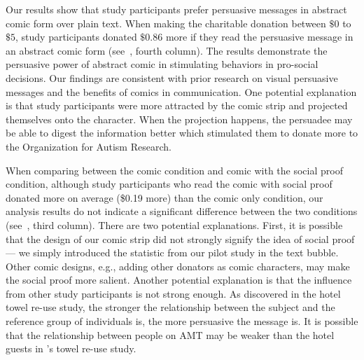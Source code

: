 \begin{description} [leftmargin=\parindent,topsep=0pt,partopsep=3pt,parsep=0pt,itemsep=3pt, listparindent=\parindent]
    \item[Comic vs. Plain Text:] Our results show that study participants prefer persuasive messages in abstract comic form over plain text. When making the charitable donation between $\$0$ to $\$5$, study participants donated $\$ 0.86$ more if they read the persuasive message in an abstract comic form (see~, fourth column). The results demonstrate the persuasive power of abstract comic in stimulating behaviors in pro-social decisions. Our findings are consistent with prior research on visual persuasive messages and the benefits of comics in communication. One potential explanation is that study participants were more attracted by the comic strip and projected themselves onto the character. When the projection happens, the persuadee may be able to digest the information better which stimulated them to donate more to the Organization for Autism Research. 
    
    \item[Social Proof Condition:] When comparing between the comic condition and comic with the social proof condition, although study participants who read the comic with social proof donated more on average (\$0.19 more) than the comic only condition, our analysis results do not indicate a significant difference between the two conditions (see~, third column). 
    There are two potential explanations. First, it is possible that the design of our comic strip did not strongly signify the idea of social proof --- we simply introduced the statistic from our pilot study in the text bubble. Other comic designs, e.g., adding other donators as comic characters, may make the social proof more salient. Another potential explanation is that the influence from other study participants is not strong enough. As \textcite{goldstein2008room} discovered in the hotel towel re-use study, the stronger the relationship between the subject and the reference group of individuals is, the more persuasive the message is. It is possible that the relationship between people on AMT may be weaker than the hotel guests in \textcite{goldstein2008room}'s towel re-use study.


\end{description}
